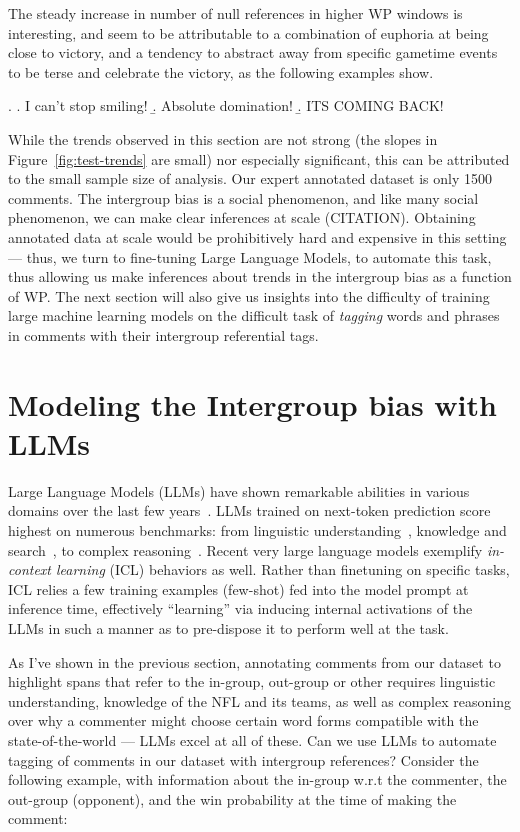 The steady increase in number of null references in higher WP windows is interesting, and seem to be attributable to a combination of euphoria at being close to victory, and a tendency to abstract away from specific gametime events to be terse and celebrate the victory, as the following examples show.

\ex. \a. I can't stop smiling!
     \b. Absolute domination!
     \b. ITS COMING BACK!

While the trends observed in this section are not strong (the slopes in Figure~\ref{fig:test-trends} are small) nor especially significant, this can be attributed to the small sample size of analysis. Our expert annotated dataset is only 1500 comments. The intergroup bias is a social phenomenon, and like many social phenomenon, we can make clear inferences at scale (CITATION). Obtaining annotated data at scale would be prohibitively hard and expensive in this setting --- thus, we turn to fine-tuning Large Language Models, to automate this task, thus allowing us make inferences about trends in the intergroup bias as a function of WP. The next section will also give us insights into the difficulty of training large machine learning models on the difficult task of \emph{tagging} words and phrases in comments with their intergroup referential tags.

\section{Modeling the Intergroup bias with LLMs}
\label{sec:football-models}

Large Language Models (LLMs) have shown remarkable abilities in various domains over the last few years~\citep{Brown2020LanguageMA}. LLMs trained on next-token prediction score highest on numerous benchmarks: from linguistic understanding~\citep{srivastava2023beyond}, knowledge and search~\citep{geminiteam2023gemini}, to complex reasoning~\citep{NEURIPS2022_9d560961}. Recent very large language models exemplify \emph{in-context learning} (ICL) behaviors as well. Rather than finetuning on specific tasks, ICL relies a few training examples (few-shot) fed into the model prompt at inference time, effectively ``learning'' via inducing internal activations of the LLMs in such a manner as to pre-dispose it to perform well at the task.

As I've shown in the previous section, annotating comments from our dataset to highlight spans that refer to the in-group, out-group or other requires linguistic understanding, knowledge of the NFL and its teams, as well as complex reasoning over why a commenter might choose certain word forms compatible with the state-of-the-world --- LLMs excel at all of these. Can we use LLMs to automate tagging of comments in our dataset with intergroup references? Consider the following example, with information about the in-group w.r.t the commenter, the out-group (opponent), and the win probability at the time of making the comment:

